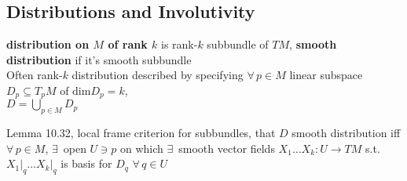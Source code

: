 %                                               
%                                                              
%
%
%

\subsection*{Distributions and Involutivity}

\textbf{distribution on $M$ of rank $k$} is rank-$k$ subbundle of $TM$, \textbf{smooth distribution} if it's smooth subbundle \\
Often rank-$k$ distribution described by specifying $\forall \, p \in M$ linear subspace $D_p \subseteq T_pM$ of $\text{dim}D_p = k$, \\
\phantom{\quad \quad \,} $D = \bigcup_{p \in M} D_p$

Lemma 10.32, local frame criterion for subbundles, that $D$ smooth distribution iff $\forall \, p \in M$, $\exists \, $ open $U \ni p$ on which $\exists \, $ smooth vector fields $X_1 \dots X_k : U \to TM$ s.t. $\left. X_1 \right|_q \dots \left. X_k \right|_q$ is basis for $D_q$ $\forall \, q \in U$

